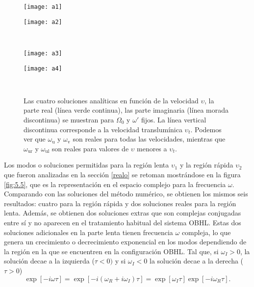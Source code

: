 \begin{center}
\begin{figure}
\begin{minipage}[c]{0.5\textwidth}
\texttt{[image: a1]}
  \end{minipage}%
\begin{minipage}[c]{0.5\textwidth}
\texttt{[image: a2]}
\end{minipage}\\[20pt]                 
\begin{minipage}[c]{0.5\textwidth}
\texttt{[image: a3]}
  \end{minipage}%
\begin{minipage}[c]{0.5\textwidth}
\texttt{[image: a4]}

\end{minipage}\\[20pt] 
\caption{Las cuatro soluciones analíticas en  funci\'{o}n de la velocidad $\upsilon$, la parte real (l\'{i}nea verde continua), las parte imaginaria (l\'{i}nea morada discontinua) se muestran para $\Omega_0$ y $\omega'$ fijos. La  l\'{i}nea vertical discontinua corresponde a la velocidad translum\'{i}nica $\upsilon_t$. Podemos ver que $\omega_{\text{u}}$ y $\omega_{\text{v}}$ son reales para todas las velocidades, mientras que $\omega_{\text{ur}}$ y $\omega_{\text{ul}}$ son reales para valores de $\upsilon$ menores a $\upsilon_t$.}\label{fig:5.4}   
\end{figure}

\end{center}

Los modos o soluciones permitidas para la regi\'{o}n lenta $\upsilon_1$ y la regi\'{o}n r\'{a}pida $\upsilon_2$ que fueron analizadas en la secci\'{o}n \ref{realo} se retoman mostr\'{a}ndose en la figura \ref{fig:5.5}, que es la representaci\'{o}n en el espacio complejo para la frecuencia $\omega$. Comparando con las soluciones del método numérico, se obtienen los mismos seis resultados: cuatro para la región r\'{a}pida y  dos soluciones reales para la región lenta. Además, se obtienen dos soluciones extras que son complejas conjugadas entre sí y no aparecen en el tratamiento habitual del sistema OBHL. Estas dos soluciones adicionales en la parte lenta tienen frecuencia $\omega$ compleja, lo que genera un crecimiento o decrecimiento exponencial en los modos dependiendo de la regi\'{o}n en la que se encuentren en la configuraci\'{o}n OBHL. Tal que, si $\omega_I>0$, la soluci\'{o}n decae a la izquierda ($\tau<0)$ y si $\omega_I<0$ la soluci\'{o}n decae a la derecha ($\tau>0$)
\begin{equation}
\exp[-i\omega \tau]=\exp[-i(\omega_R+i\omega_I)\tau]=\exp[\omega_I\tau]\exp[-i\omega_R\tau].
\end{equation}

